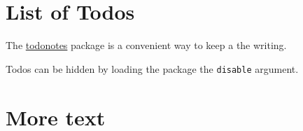 \section{List of Todos}

The \href{https://www.ctan.org/pkg/todonotes}{todonotes} package is a convenient way to keep a  the writing.  


Todos can be hidden by loading the package the \texttt{disable} argument.


\section{More text}

\lipsum[1-12]
